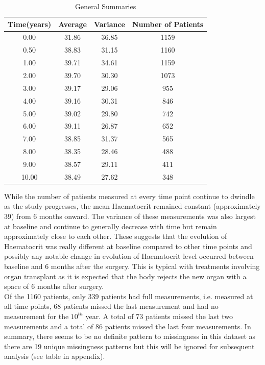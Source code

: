\documentclass[11pt]{article}
\begin{document}
\begin{table}[H]
\centering
\begin{tabular}{cccc}
  \hline
Time(years) & Average & Variance & Number of Patients \\ 
  \hline
0.00 & 31.86 & 36.85 & 1159 \\ 
0.50 & 38.83 & 31.15 & 1160 \\ 
1.00 & 39.71 & 34.61 & 1159 \\ 
2.00 & 39.70 & 30.30 & 1073 \\ 
3.00 & 39.17 & 29.06 & 955 \\ 
4.00 & 39.16 & 30.31 & 846 \\ 
5.00 & 39.02 & 29.80 & 742 \\ 
6.00 & 39.11 & 26.87 & 652 \\ 
7.00 & 38.85 & 31.37 & 565 \\ 
8.00 & 38.35 & 28.46 & 488 \\ 
9.00 & 38.57 & 29.11 & 411 \\ 
10.00 & 38.49 & 27.62 & 348 \\ 
   \hline
\end{tabular}
\caption{General Summaries}
\end{table}

\noindent While the number of patients measured at every time point continue to dwindle as the study progresses, the mean Haematocrit remained constant (approximately 39) from 6 months onward. The variance of these measurements was also largest at baseline and continue to generally decrease with time but remain approximately close to each other. These suggests that the evolution of Haematocrit was really different at baseline compared to other time points and possibly any notable change in evolution of Haematocrit level occurred between baseline and 6 months after the surgery. This is typical with treatments involving organ transplant as it is expected that the body rejects the new organ with a space of 6 months after surgery.  \\

\noindent Of the 1160 patients, only 339 patients had full measurements, i.e. measured at all time points, 68 patients missed the last measurement and had no measurement for the $10^{th}$ year. A total of 73 patients missed the last two measurements and a total of 86 patients missed the last four measurements. In summary, there seems to be no definite pattern to missingness in this dataset as there are 19 unique missingness patterns but this will be ignored for subsequent analysis (see table in appendix).
\end{document}
